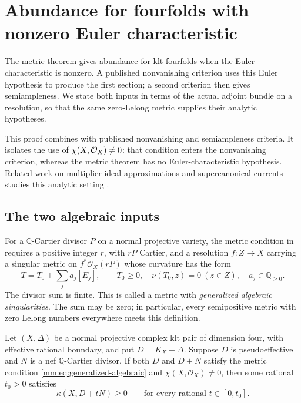 \section{Abundance for fourfolds with nonzero Euler characteristic}
\label{sec:euler-route}

The metric theorem gives abundance for klt fourfolds when
the Euler characteristic is nonzero. A published nonvanishing
criterion uses this Euler hypothesis to produce the first
section; a second criterion then gives semiampleness. We state
both inputs in terms of the actual adjoint bundle on a resolution,
so that the same zero-Lelong metric supplies their analytic
hypotheses.


This proof combines  with published
nonvanishing and semiampleness criteria. It isolates the use of
$\chi(X,\mathcal O_X)\ne0$: that condition enters the nonvanishing
criterion, whereas the metric theorem has no Euler-characteristic
hypothesis. Related work on multiplier-ideal approximations and
supercanonical currents studies this analytic setting
\cite[Theorems~A--B]{Lazic2024Metrics}.

\subsection*{The two algebraic inputs}

For a $\mathbb Q$-Cartier divisor $P$ on a normal projective variety,
the metric condition in \cite[Definition~2.12]{LazicPeternell2020}
requires a positive integer $r$, with $rP$ Cartier, and a resolution
$f:Z\to X$ carrying a singular metric on $f^*\mathcal O_X(rP)$ whose
curvature has the form
\begin{equation}\label{mm:eq:generalized-algebraic}
 T=T_0+\sum_j a_j[E_j],\qquad
 T_0\geq0,\quad \nu(T_0,z)=0\ (z\in Z),\quad a_j\in\mathbb Q_{\geq0}.
\end{equation}
The divisor sum is finite. This is called a metric with
\emph{generalized algebraic singularities}. The sum may be zero;
in particular, every semipositive metric with zero Lelong numbers
everywhere meets this definition.

\begin{theorem}
\label{mm:thm:lp-fourfold}
Let $(X,\Delta)$ be a normal projective complex klt pair of dimension
four, with effective rational boundary, and put $D=K_X+\Delta$.
Suppose $D$ is pseudoeffective and $N$ is a nef $\mathbb Q$-Cartier
divisor. If both $D$ and $D+N$ satisfy the metric condition
\eqref{mm:eq:generalized-algebraic} and $\chi(X,\mathcal O_X)\ne0$,
then some rational $t_0>0$ satisfies
\[
 \kappa(X,D+tN)\geq0\qquad
 \text{for every rational }t\in[0,t_0].
\]
\end{theorem}

